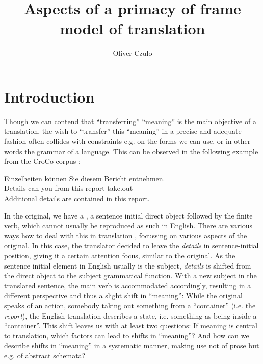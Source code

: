 \documentclass[output=paper]{LSP/langsci}
\title{Aspects of a primacy of frame model of translation}
\author{Oliver Czulo
\affiliation{University of Leipzig}
}
\begin{document}
\section{Introduction}\label{czulo:sec:1}

Though we can contend that ``transferring'' ``meaning'' is the main objective of a translation, the wish to ``transfer'' this ``meaning'' in a precise and adequate fashion often collides with constraints e.g. on the forms we can use, or in other words the grammar of a language. This can be observed in the following example from the CroCo-corpus \citep{HansenSchirra2012Cross}:


\ea\label{czulo:ex:1}  Einzelheiten können Sie diesem Bericht entnehmen.\\
Details can you from-this report take.out \\
\glt Additional details are contained in this report.
\z

In the  original, we have a , a sentence initial direct object followed by the finite verb, which cannot usually be reproduced as such in English. There are various ways how to deal with this in translation \citep{HansenSchirra2008, Culo2016}, focussing on various aspects of the original. In this case, the translator decided to leave the \textit{details} in sentence-initial position, giving it a certain attention focus, similar to the  original. As the sentence initial element in English usually is the subject, \textit{details} is shifted from the direct object to the subject grammatical function. With a new subject in the translated sentence, the main verb is accommodated accordingly, resulting in a different perspective and thus a slight shift in ``meaning'': While the  original speaks of an action, somebody taking out something from a ``container'' (i.e. the \textit{report}), the English translation describes a state, i.e. something as being inside a ``container''. This shift leaves us with at least two questions: If meaning is central to translation, which factors can lead to shifts in ``meaning''? And how can we describe shifts in ``meaning'' in a systematic manner, making use not of prose but e.g. of abstract schemata?
\end{document}
